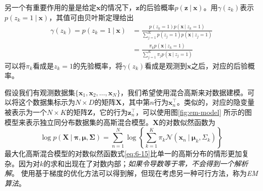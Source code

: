 \documentclass[11pt]{ctexbook}
\begin{document}
另一个有重要作用的量是给定$\bm x$的情况下，$\bm z$的后验概率$p(\bm z\ |\ \bm x)$。用$\mathcal \gamma(z_k)$表示$p(z_k=1\ |\ \bm x)$，其值可由贝叶斯定理给出
\begin{align}
	\gamma(z_k) = p(z_k=1\ |\ \bm x) &= \frac{p(z_k=1)p(\bm x\ |\ z_k=1)}{\sum_{j=1}^{K}p(z_j=1)p(\bm x\ |\ z_j=1)} \\
									 &= \frac{\pi_k p(\bm x\ |\ z_k=1)}{\sum_{j=1}^{K}\pi_j p(\bm x\ |\ z_j=1)} 
\end{align}
可以将$\pi_k$看成是$z_k=1$的先验概率，将$\gamma(z_k)$看成是观测到$\bm x$之后，对应的后验概率。

假设我们有观测数据集$\{\bm x_1, \bm x_2, \ldots, \bm x_N\}$，我们希望使用混合高斯来对数据建模。可以将这个数据集标示为$N\times D$的矩阵$\bm X$，其中第$n$行为$\bm x_n^\top$。类似的，对应的隐变量被表示为一个$N\times K$的矩阵$\bm Z$，它的行为$\bm z_n^\top$，可以使用图\ref{fig:em-model} 所示的图模型来表示独立同分布数据集的高斯混合模型。$\bm X$的对数似然函数为
\begin{equation}
	\label{eq:6-15}
	\log p(\bm X\ |\ \bm \pi, \bm \mu, \bm \Sigma)=\sum_{n=1}^{N}\log\left\{ \sum_{k=1}^{K}\pi_k\mathcal N(\bm x_n\ |\ \bm \mu_k, \Sigma_k) \right\}
\end{equation}
最大化高斯混合模型的对数似然函数式\ref{eq:6-15}比单一的高斯分布的情形更加复杂。因为对$k$的求和出现在了对数内部；\emph{如果令导数等于零，不会得到一个解析解}。
使用基于梯度的优化方法可以得到解，但现在考虑另一种可行方法，称为\emph{EM算法}。
\end{document}
